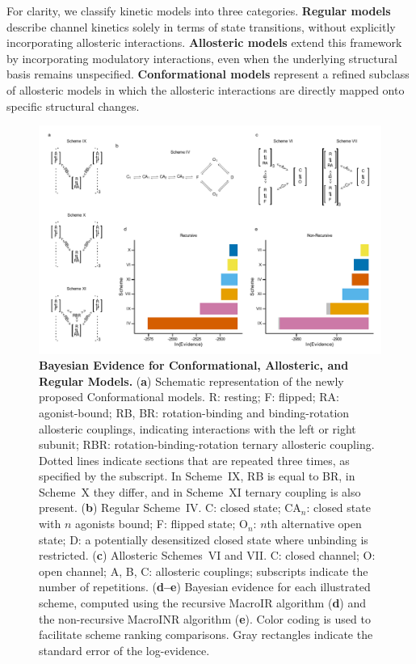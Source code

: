 \documentclass[pdflatex,sn-mathphys-num]{sn-jnl}%
\theoremstyle{thmstyleone}%
\theoremstyle{thmstyletwo}%
\theoremstyle{thmstylethree}%
\begin{document}
For clarity, we classify kinetic models into three categories. \textbf{Regular models} describe channel kinetics solely in terms of state transitions, without explicitly incorporating allosteric interactions. \textbf{Allosteric models} extend this framework by incorporating modulatory interactions, even when the underlying structural basis remains unspecified. \textbf{Conformational models} represent a refined subclass of allosteric models in which the allosteric interactions are directly mapped onto specific structural changes.
\begin{figure}[t]
	\centering
	\includegraphics[width=\linewidth]{Figure_1.pdf}
	\caption{\textbf{Bayesian Evidence for Conformational, Allosteric, and Regular Models.}  
		(\textbf{a}) Schematic representation of the newly proposed Conformational models. R: resting; F: flipped; RA: agonist-bound; RB, BR: rotation-binding and binding-rotation allosteric couplings, indicating interactions with the left or right subunit; RBR: rotation-binding-rotation ternary allosteric coupling. Dotted lines indicate sections that are repeated three times, as specified by the subscript. In Scheme~IX, RB is equal to BR, in Scheme~X they differ, and in Scheme~XI ternary coupling is also present.  
		(\textbf{b}) Regular Scheme~IV. C: closed state; CA$_n$: closed state with $n$ agonists bound; F: flipped state; O$_n$: $n$th alternative open state; D: a potentially desensitized closed state where unbinding is restricted.  
		(\textbf{c}) Allosteric Schemes~VI and VII. C: closed channel; O: open channel; A, B, C: allosteric couplings; subscripts indicate the number of repetitions.  
		(\textbf{d--e}) Bayesian evidence for each illustrated scheme, computed using the recursive MacroIR algorithm (\textbf{d}) and the non-recursive MacroINR algorithm (\textbf{e}). Color coding is used to facilitate scheme ranking comparisons. Gray rectangles indicate the standard error of the log-evidence.  
	}
	\label{fig:figure1}
\end{figure}
\end{document}
